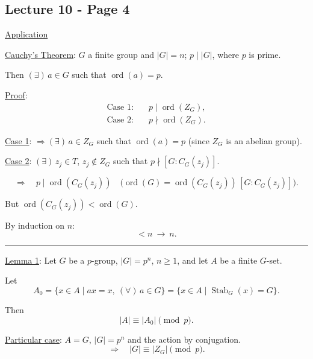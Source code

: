 
\subsection*{Lecture 10 - Page 4}

\noindent\underline{Application}

\medskip
\noindent\underline{Cauchy's Theorem}: $G$ a finite group and $|G|=n$;
$p\mid |G|$, where $p$ is prime.

\medskip
\noindent Then $(\exists)\,a\in G$ such that $\operatorname{ord}(a)=p$.

\bigskip
\noindent\underline{Proof}:
\begin{align*}
\text{Case 1:}\quad & p\mid\operatorname{ord}(Z_G),\\
\text{Case 2:}\quad & p\nmid\operatorname{ord}(Z_G).
\end{align*}

\noindent\underline{Case 1}: $\Longrightarrow (\exists)\,a\in Z_G$
such that $\operatorname{ord}(a)=p$ (since $Z_G$ is an abelian group).

\medskip
\noindent\underline{Case 2}: $(\exists)\,z_j\in T$, $z_j\notin Z_G$
such that $p\nmid [G:C_G(z_j)]$.

\[
\Longrightarrow\quad p\mid\operatorname{ord}(C_G(z_j))
\quad\bigl(\operatorname{ord}(G)
=\operatorname{ord}(C_G(z_j))\,[G:C_G(z_j)]\bigr).
\]

\noindent But $\operatorname{ord}(C_G(z_j))<\operatorname{ord}(G)$.

\medskip
\noindent By induction on $n$:
\[
<n\ \longrightarrow\ n.
\]

\bigskip
\hrule
\bigskip

\noindent\underline{Lemma 1}: Let $G$ be a $p$-group, $|G|=p^n$,
$n\geq 1$, and let $A$ be a finite $G$-set.

\medskip
\noindent Let
\[
A_0=\{x\in A\mid ax=x,\ (\forall)\,a\in G\}
   =\{x\in A\mid \operatorname{Stab}_G(x)=G\}.
\]

\noindent Then
\[
|A|\equiv |A_0|\pmod p.
\]

\bigskip
\noindent\underline{Particular case}: $A=G$, $|G|=p^n$
and the action by conjugation.
\[
\Longrightarrow\quad |G|\equiv |Z_G|\pmod p.
\]

